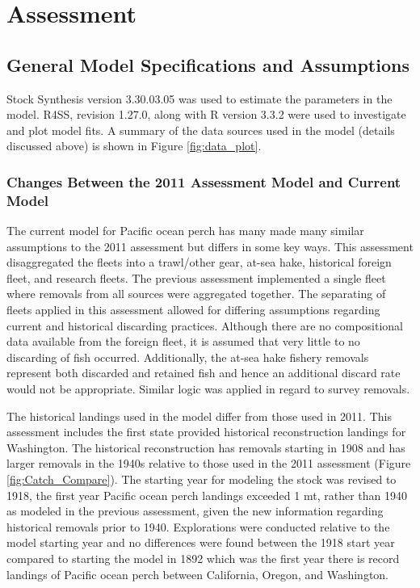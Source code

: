 \documentclass[12pt,]{article}
\begin{document}
\section{Assessment}\label{assessment}

\subsection{General Model Specifications and
Assumptions}\label{general-model-specifications-and-assumptions}

Stock Synthesis version 3.30.03.05 was used to estimate the parameters
in the model. R4SS, revision 1.27.0, along with R version 3.3.2 were
used to investigate and plot model fits. A summary of the data sources
used in the model (details discussed above) is shown in Figure
\ref{fig:data_plot}.

\subsubsection{Changes Between the 2011 Assessment Model and Current
Model}\label{changes-between-the-2011-assessment-model-and-current-model}

The current model for Pacific ocean perch has many made many similar
assumptions to the 2011 assessment but differs in some key ways. This
assessment disaggregated the fleets into a trawl/other gear, at-sea
hake, historical foreign fleet, and research fleets. The previous
assessment implemented a single fleet where removals from all sources
were aggregated together. The separating of fleets applied in this
assessment allowed for differing assumptions regarding current and
historical discarding practices. Although there are no compositional
data available from the foreign fleet, it is assumed that very little to
no discarding of fish occurred. Additionally, the at-sea hake fishery
removals represent both discarded and retained fish and hence an
additional discard rate would not be appropriate. Similar logic was
applied in regard to survey removals.

The historical landings used in the model differ from those used in
2011. This assessment includes the first state provided historical
reconstruction landings for Washington. The historical reconstruction
has removals starting in 1908 and has larger removals in the 1940s
relative to those used in the 2011 assessment (Figure
\ref{fig:Catch_Compare}). The starting year for modeling the stock was
revised to 1918, the first year Pacific ocean perch landings exceeded 1
mt, rather than 1940 as modeled in the previous assessment, given the
new information regarding historical removals prior to 1940.
Explorations were conducted relative to the model starting year and no
differences were found between the 1918 start year compared to starting
the model in 1892 which was the first year there is record landings of
Pacific ocean perch between California, Oregon, and Washington.
\end{document}
